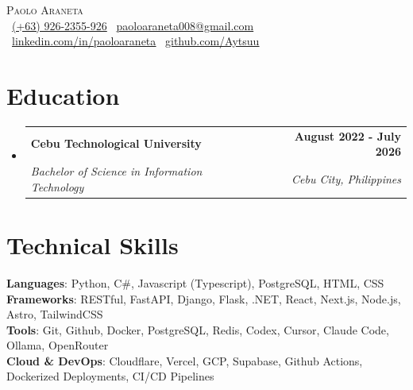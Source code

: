 \documentclass[letterpaper,11pt]{article}
\makeatletter
\newcommand{\resumeSubheading}[4]{
  \vspace{-2pt}\item
    \begin{tabular*}{1.0\textwidth}[t]{l@{\extracolsep{\fill}}r}
      \textbf{#1} & \textbf{\small #2} \\
      \textit{\small#3} & \textit{\small #4} \\
    \end{tabular*}\vspace{-7pt}
}
\newcommand{\resumeSubHeadingListStart}{\begin{itemize}[leftmargin=0.0in, label={}]}
\newcommand{\resumeSubHeadingListEnd}{\end{itemize}}\vspace{0pt}
\makeatother
\begin{document}
\begin{center}
    {\Large \scshape Paolo Araneta} \\[2mm]
    \footnotesize \raisebox{-0.1\height}
  \ \underline{(+63) 926-2355-926} \hspace{0.2em}\textbar\hspace{0.2em}
  {\  \underline{paoloaraneta008@gmail.com}} \hspace{0.2em}\textbar\hspace{0.2em}
  {\ \underline{\href{https://www.linkedin.com/in/paoloaraneta/}{linkedin.com/in/paoloaraneta}}} \hspace{0.2em}\textbar\hspace{0.2em}
  {\ \underline{\href{https://github.com/Aytsuu}{github.com/Aytsuu}}}
    \vspace{-8pt}
    \vspace{12pt}
\end{center}

\section{Education}
  \resumeSubHeadingListStart
    \resumeSubheading
      {Cebu Technological University}{August 2022 - July 2026}
      {Bachelor of Science in Information Technology
      }{Cebu City, Philippines}
  \resumeSubHeadingListEnd
    \vspace{-12pt}
\section{Technical Skills}
 \begin{itemize}[leftmargin=0.15in, label={}]
    \small{\item{   
      \textbf{Languages}{: Python, C\#, Javascript (Typescript), PostgreSQL, HTML, CSS} \\[1mm]
      \textbf{Frameworks}{: RESTful, FastAPI, Django, Flask, .NET, React, Next.js, Node.js, Astro, TailwindCSS} \\[1mm]
      \textbf{Tools}{: Git, Github, Docker, PostgreSQL, Redis, Codex, Cursor, Claude Code, Ollama, OpenRouter} \\[1mm]
      \textbf{Cloud \& DevOps}{: Cloudflare, Vercel, GCP, Supabase, Github Actions, Dockerized Deployments, CI/CD Pipelines} \\[1mm]
    }}
 \end{itemize}
 \vspace{-16pt}
 \vspace{3pt}
\end{document}
